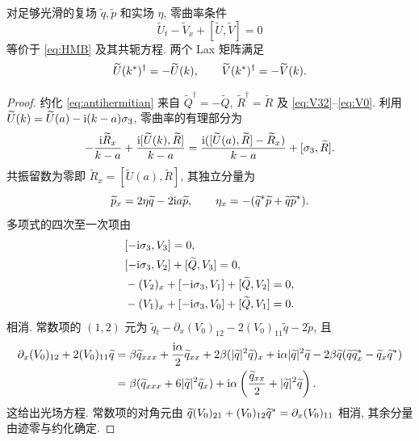\begin{proposition}\label{prop:zc}
对足够光滑的复场 $\widetilde q,\widetilde p$ 和实场 $\eta$, 零曲率条件
\begin{equation}\label{eq:zc}
\widetilde U_t-\widetilde V_x+[\widetilde U,\widetilde V]=0
\end{equation}
等价于 \eqref{eq:HMB} 及其共轭方程. 两个 Lax 矩阵满足
\begin{equation}\label{eq:antihermitian}
\widetilde U({k}^{*})^\dagger=-\widetilde U(k),\qquad
\widetilde V({k}^{*})^\dagger=-\widetilde V(k).
\end{equation}
\end{proposition}
\begin{proof}
约化 \eqref{eq:antihermitian} 来自 $\widetilde Q^\dagger=-\widetilde Q$, $\widetilde R^\dagger=\widetilde R$ 及 \eqref{eq:V32}--\eqref{eq:V0}. 利用 $\widetilde U(k)=\widetilde U(a)-\mathrm{i}(k-a)\sigma_3$, 零曲率的有理部分为
\begin{equation}\label{eq:rationalzc}
-\dfrac{\mathrm{i} \widetilde R_x}{k-a}+\dfrac{\mathrm{i}[\widetilde U(k),\widetilde R]}{k-a}
=\dfrac{\mathrm{i}([\widetilde U(a),\widetilde R]-\widetilde R_x)}{k-a}+[\sigma_3,\widetilde R].
\end{equation}
共振留数为零即 $\widetilde R_x=[\widetilde U(a),\widetilde R]$, 其独立分量为
\begin{equation*}
\widetilde p_x=2\eta \widetilde q-2\mathrm{i} a\widetilde p,\qquad
\eta_x=-({\widetilde q}^{*}\widetilde p+\widetilde q{\widetilde p}^{*}).
\end{equation*}
多项式的四次至一次项由
\begin{equation*}
\begin{aligned}
&[-\mathrm{i}\sigma_3,V_3]=0,\\
&[-\mathrm{i}\sigma_3,V_2]+[\widetilde Q,V_3]=0,\\
&-(V_2)_x+[-\mathrm{i}\sigma_3,V_1]+[\widetilde Q,V_2]=0,\\
&-(V_1)_x+[-\mathrm{i}\sigma_3,V_0]+[\widetilde Q,V_1]=0.
\end{aligned}
\end{equation*}
相消. 常数项的 $(1,2)$ 元为
$\widetilde q_t-\partial_x(V_0)_{12}-2(V_0)_{11}\widetilde q-2\widetilde p$, 且
\begin{align*}
\partial_x(V_0)_{12}+2(V_0)_{11}\widetilde q
&=\beta \widetilde q_{xxx}+\dfrac{\mathrm{i}\alpha}{2}\widetilde q_{xx}
+2\beta(|\widetilde q|^2\widetilde q)_x+\mathrm{i}\alpha|\widetilde q|^2\widetilde q
-2\beta \widetilde q(\widetilde q{\widetilde q_x}^{*}-\widetilde q_x{\widetilde q}^{*})\\
&=\beta(\widetilde q_{xxx}+6|\widetilde q|^2\widetilde q_x)
+\mathrm{i}\alpha\left(\dfrac{\widetilde q_{xx}}{2}+|\widetilde q|^2\widetilde q\right).
\end{align*}
这给出光场方程. 常数项的对角元由
$\widetilde q(V_0)_{21}+(V_0)_{12}{\widetilde q}^{*}=\partial_x(V_0)_{11}$ 相消, 其余分量由迹零与约化确定.
\end{proof}

